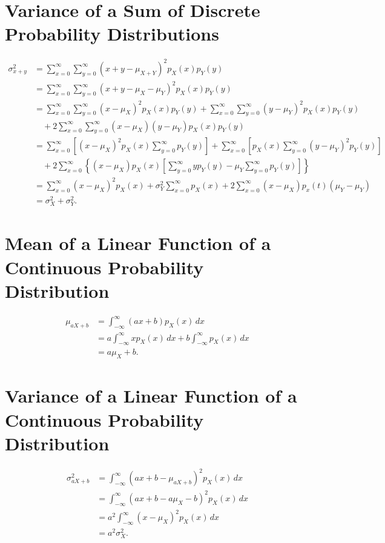 \documentclass{myart}
\newcommand{\intr}{\int_{-\infty}^\infty}
\newcommand{\dx}{\,dx}
\newcommand{\mean}{\mu}
\newcommand{\variance}{\sigma^2}
\begin{document}
\section{Variance of a Sum of Discrete Probability Distributions}

\begin{align*}
\variance_{x+y} &= \sum_{x=0}^\infty \sum_{y=0}^\infty (x + y - \mean_{X+Y})^2 p_X(x) p_Y(y) \\
&= \sum_{x=0}^\infty \sum_{y=0}^\infty (x + y - \mean_X - \mean_Y)^2 p_X(x) p_Y(y) \\
&= \sum_{x=0}^\infty \sum_{y=0}^\infty (x - \mean_X)^2 p_X(x) p_Y(y) + \sum_{x=0}^\infty \sum_{y=0}^\infty (y - \mean_Y)^2 p_X(x) p_Y(y) \\
&\quad + 2 \sum_{x=0}^\infty \sum_{y=0}^\infty (x - \mean_X)(y - \mean_Y) p_X(x) p_Y(y) \\
&= \sum_{x=0}^\infty \left[(x - \mean_X)^2 p_X(x) \sum_{y=0}^\infty p_Y(y)\right] + \sum_{x=0}^\infty \left[p_X(x) \sum_{y=0}^\infty (y - \mean_Y)^2 p_Y(y)\right] \\
&\quad + 2 \sum_{x=0}^\infty \left\{(x - \mean_X) p_X(x) \left[\sum_{y=0}^\infty y p_Y(y) - \mean_Y \sum_{y=0}^\infty p_Y(y) \right]\right\} \\
&= \sum_{x=0}^\infty (x - \mean_X)^2 p_X(x) + \variance_Y \sum_{x=0}^\infty p_X(x) + 2 \sum_{x=0}^\infty (x - \mean_X) p_x(t) (\mean_Y - \mean_Y) \\
&= \variance_X + \variance_Y.
\end{align*}

\section{Mean of a Linear Function of a Continuous Probability Distribution}

\begin{align*}
\mean_{aX + b} &= \intr (ax + b) p_X(x) \dx \\
&= a \intr x p_X(x) \dx + b \intr p_X(x) \dx \\
&= a\mean_X + b.
\end{align*}

\section{Variance of a Linear Function of a Continuous Probability Distribution}

\begin{align*}
\variance_{aX+b} &= \intr (ax + b - \mean_{aX+b})^2 p_X(x) \dx \\
&= \intr (ax + b - a\mean_X - b)^2 p_X(x) \dx \\
&= a^2 \intr (x - \mean_X)^2 p_X(x) \dx \\
&= a^2 \variance_X.
\end{align*}
\end{document}
